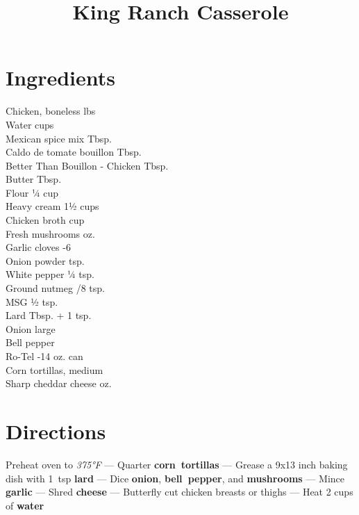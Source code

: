 \documentclass[11pt,letterpaper]{article}
\title{King Ranch Casserole}
\author{}
\date{}
\begin{document}
\maketitle
\thispagestyle{empty}

\section*{Ingredients}
\setlength{\columnsep}{20pt}
\begin{multicols}{2}
\noindent
    Chicken, boneless  lbs \\
    Water  cups \\
    Mexican spice mix  Tbsp. \\
    Caldo de tomate bouillon  Tbsp. \\
    Better Than Bouillon - Chicken  Tbsp. \\
    Butter  Tbsp. \\
    Flour \dotfill ¼ cup \\
    Heavy cream \dotfill 1½ cups \\
    Chicken broth  cup \\
    Fresh mushrooms  oz. \\
    Garlic cloves -6 \\
    \columnbreak
    Onion powder  tsp. \\
    White pepper \dotfill ¼ tsp. \\
    Ground nutmeg /8 tsp. \\
    MSG \dotfill ½ tsp. \\
    Lard  Tbsp. + 1 tsp. \\
    Onion  large \\
    Bell pepper  \\
    Ro-Tel -14 oz. can \\
    Corn tortillas, medium  \\
    Sharp cheddar cheese  oz. \\
\end{multicols}

\section*{Directions}

\noindent
Preheat oven to \textit{375°F} ---
Quarter \textbf{corn~tortillas} ---
Grease a 9x13 inch baking dish with 1~tsp \textbf{lard} ---
Dice \textbf{onion}, \textbf{bell~pepper}, and \textbf{mushrooms} ---
Mince \textbf{garlic} ---
Shred \textbf{cheese} ---
Butterfly cut chicken breasts or thighs ---
Heat 2 cups of \textbf{water}
\end{document}

